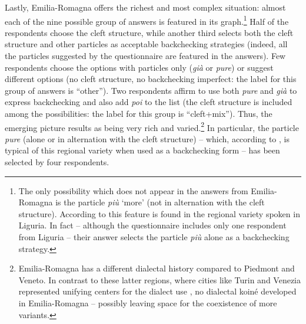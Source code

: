 Lastly, Emilia-Romagna offers the richest and most complex situation: almost each of the nine possible group of answers is featured in its graph.\footnote{The only possibility which does not appear in the answers from Emilia-Romagna is the particle \textit{più} ‘more’ (not in alternation with the cleft structure). According to \citet{FedrianiMiola2014} this feature is found in the regional variety spoken in Liguria. In fact – although the questionnaire includes only one respondent from Liguria – their answer selects the particle \textit{più} alone as a backchecking strategy.} Half of the respondents choose the cleft structure, while another third selects both the cleft structure and other particles as acceptable backchecking strategies (indeed, all the particles suggested by the questionnaire are featured in the answers). Few respondents choose the options with particles only (\textit{già} or \textit{pure}) or suggest different options (no cleft structure, no backchecking imperfect: the label for this group of answers is “other”). Two respondents affirm to use both \textit{pure} and \textit{già} to express backchecking and also add \textit{poi} to the list (the cleft structure is included among the possibilities: the label for this group is “cleft+mix”). Thus, the emerging picture results as being very rich and varied.\footnote{Emilia-Romagna has a different dialectal history compared to Piedmont and Veneto. In contrast to these latter regions, where cities like Turin and Venezia represented unifying centers for the dialect use \citep{Regis2011}, no dialectal koiné developed in Emilia-Romagna – possibly leaving space for the coexistence of more variants.} In particular, the particle \textit{pure} (alone or in alternation with the cleft structure) – which, according to \citet{FedrianiMiola2014}, is typical of this regional variety when used as a backchecking form – has been selected by four respondents.

